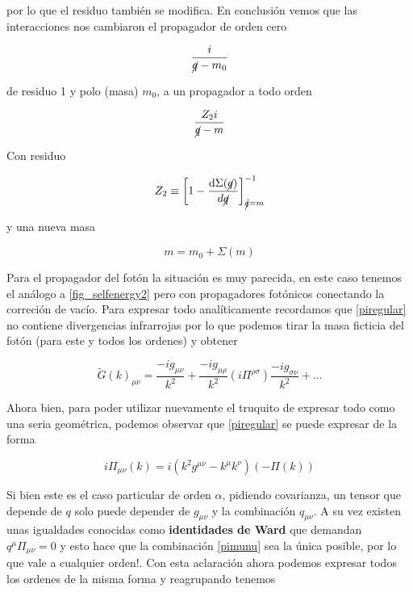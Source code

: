 \documentclass[tickz]{article}
\numberwithin{equation}{section}
\begin{document}
por lo que el residuo también se modifica. En conclusión vemos que las interacciones nos cambiaron el propagador de orden cero

\begin{equation}\label{key}
\frac{i}{\cancel{q} - m_0}
\end{equation}

de residuo 1 y polo (masa) $ m_0 $, a un propagador a todo orden

\begin{equation}\label{key}
\frac{Z_2 i}{\cancel{q}-m}
\end{equation}

Con residuo

\begin{equation}\label{z2}
Z_2 \equiv \left[ 1 -\frac{\mathrm{d}\Sigma(\cancel{q})}{d\cancel{q}}\right]^{-1}_{\cancel{q}=m}
\end{equation}

y una nueva masa

\begin{equation}\label{m}
m = m_0 +\Sigma(m)
\end{equation}

\vspace{2cm}

Para el propagador del fotón la situación es muy parecida, en este caso tenemos el análogo a \ref{fig_selfenergy2} pero con propagadores fotónicos conectando la correción de vacío. Para expresar todo analíticamente recordamos que \ref{piregular} no contiene divergencias infrarrojas por lo que podemos tirar la masa ficticia del fotón (para este y todos los ordenes) y obtener

\begin{equation}\label{key}
\widetilde{G}(k)_{\mu\nu} = \frac{-i g_{\mu\nu}}{k^2} + \frac{-i g_{\mu\rho}}{k^2}\left(i\Pi^{\rho\sigma}\right)\frac{-i g_{\sigma\nu}}{k^2} + \dots 
\end{equation}

Ahora bien, para poder utilizar nuevamente el truquito de expresar todo como una seria geométrica, podemos observar que \ref{piregular} se puede expresar de la forma

\begin{equation}\label{pimunu}
i\Pi_{\mu\nu}(k) =i\left(k^2g^{\mu\nu} - k^{\mu}k^{\nu}\right) \left(-\Pi(k)\right)
\end{equation}

Si bien este es el caso particular de orden $ \alpha $, pidiendo covarianza, un tensor que depende de $ q $ solo puede depender de $ g_{\mu\nu} $ y la combinación $ q_{\mu\nu} $. A su vez existen unas igualdades conocidas como \textbf{identidades de Ward} que demandan $ q^{\mu}\Pi_{\mu\nu}=0 $ y esto hace que la combinación \ref{pimunu} sea la única posible, por lo que vale a cualquier orden!. Con esta aclaración ahora podemos expresar todos los ordenes de la misma forma y reagrupando tenemos
\end{document}
